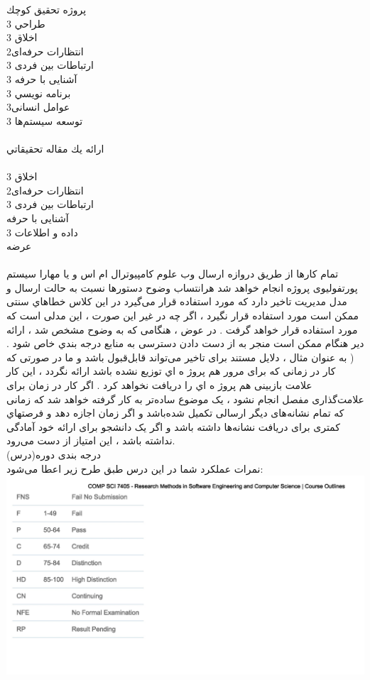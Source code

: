 \documentclass[a4 paper,12pt]{article}\usepackage{float, graphicx,xepersian }
\begin{document}
\noindent
پروژه تحقيق كوچك \\
\noindent
طراحي 3\\
اخلاق  3\\
انتظارات حرفه‌ای2 \\
ارتباطات بین فردی 3 \\
آشنایی با حرفه
3\\
برنامه نويسي  3\\
عوامل انسانی3 \\ 
توسعه سیستم‌ها 3\\
\\
\noindent
ارائه يك مقاله تحقيقاتي \\
\\
اخلاق 3\\
انتظارات حرفه‌ای2 \\
ارتباطات بین فردی 3 \\
آشنایی با حرفه
\\
داده و اطلاعات 3\\
عرضه\\
\\
\noindent
تمام کارها از طریق دروازه ارسال وب علوم کامپیوترال ام اس و یا مهارا سیستم پورتفولیوی پروژه انجام خواهد شد  هرانتساب وضوح دستورها نسبت به حالت ارسال و مدل مدیریت تاخیر دارد که مورد استفاده قرار می‌گیرد 
در این کلاس خطاهاي سنتی ممکن است مورد استفاده قرار نگیرد ، اگر چه در غیر این صورت ، این مدلی است که مورد استفاده قرار خواهد گرفت . در عوض ، هنگامی که به وضوح مشخص شد ، ارائه دیر هنگام ممکن است منجر به از دست دادن دسترسی به منابع درجه بندي خاص شود . ( به عنوان مثال ، دلایل مستند برای تاخیر می‌تواند قابل‌قبول باشد و ما در صورتی که کار در زمانی که برای مرور هم پروژ ه اي توزیع نشده باشد ارائه نگردد ، این کار علامت بازبینی هم پروژ ه اي را دریافت نخواهد کرد . اگر کار در زمان برای علامت‌گذاری مفصل انجام نشود ، یک موضوع ساده‌تر به کار گرفته خواهد شد که زمانی که تمام نشانه‌های دیگر ارسالی تکمیل شده‌باشد و اگر زمان اجازه ‌دهد و فرصتهاي کمتری برای دریافت نشانه‌ها داشته باشد و اگر یک دانشجو برای ارائه خود آمادگی نداشته باشد ، این امتیاز از دست می‌رود.
\\
درجه بندی دوره(درس)\\
نمرات عملکرد شما در این درس طبق طرح زیر اعطا می‌شود: \\
	\includegraphics[scale=0.37]{pic2.jpg}
\end{document}
